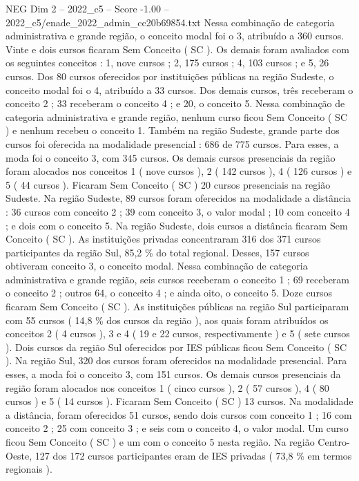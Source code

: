 \begin{textsample}{NEG Dim 2 – 2022\_c5 – Score -1.00 – 2022\_c5/enade\_2022\_admin\_cc20b69854.txt}
Nessa combinação de categoria administrativa e grande região, o conceito modal foi o 3, atribuído a 360 cursos.
Vinte e dois cursos ficaram Sem Conceito ( SC ).
Os demais foram avaliados com os seguintes conceitos : 1, nove cursos ; 2, 175 cursos ; 4, 103 cursos ; e 5, 26 cursos.
Dos 80 cursos oferecidos por instituições públicas na região Sudeste, o conceito modal foi o 4, atribuído a 33 cursos.
Dos demais cursos, três receberam o conceito 2 ; 33 receberam o conceito 4 ; e 20, o conceito 5.
Nessa combinação de categoria administrativa e grande região, nenhum curso ficou Sem Conceito ( SC ) e nenhum recebeu o conceito 1.
Também na região Sudeste, grande parte dos cursos foi oferecida na modalidade presencial : 686 de 775 cursos.
Para esses, a moda foi o conceito 3, com 345 cursos.
Os demais cursos presenciais da região foram alocados nos conceitos 1 ( nove cursos ), 2 ( 142 cursos ), 4 ( 126 cursos ) e 5 ( 44 cursos ).
Ficaram Sem Conceito ( SC ) 20 cursos presenciais na região Sudeste.
Na região Sudeste, 89 cursos foram oferecidos na modalidade a distância : 36 cursos com conceito 2 ; 39 com conceito 3, o valor modal ; 10 com conceito 4 ; e dois com o conceito 5.
Na região Sudeste, dois cursos a distância ficaram Sem Conceito ( SC ).
As instituições privadas concentraram 316 dos 371 cursos participantes da região Sul, 85,2 \% do total regional.
Desses, 157 cursos obtiveram conceito 3, o conceito modal.
Nessa combinação de categoria administrativa e grande região, seis cursos receberam o conceito 1 ; 69 receberam o conceito 2 ; outros 64, o conceito 4 ; e ainda oito, o conceito 5.
Doze cursos ficaram Sem Conceito ( SC ).
As instituições públicas na região Sul participaram com 55 cursos ( 14,8 \% dos cursos da região ), aos quais foram atribuídos os conceitos 2 ( 4 cursos ), 3 e 4 ( 19 e 22 cursos, respectivamente ) e 5 ( sete cursos ).
Dois cursos da região Sul oferecidos por IES públicas ficou Sem Conceito ( SC ).
Na região Sul, 320 dos cursos foram oferecidos na modalidade presencial.
Para esses, a moda foi o conceito 3, com 151 cursos.
Os demais cursos presenciais da região foram alocados nos conceitos 1 ( cinco cursos ), 2 ( 57 cursos ), 4 ( 80 cursos ) e 5 ( 14 cursos ).
Ficaram Sem Conceito ( SC ) 13 cursos.
Na modalidade a distância, foram oferecidos 51 cursos, sendo dois cursos com conceito 1 ; 16 com conceito 2 ; 25 com conceito 3 ; e seis com o conceito 4, o valor modal.
Um curso ficou Sem Conceito ( SC ) e um com o conceito 5 nesta região.
Na região Centro-Oeste, 127 dos 172 cursos participantes eram de IES privadas ( 73,8 \% em termos regionais ).

\end{textsample}
